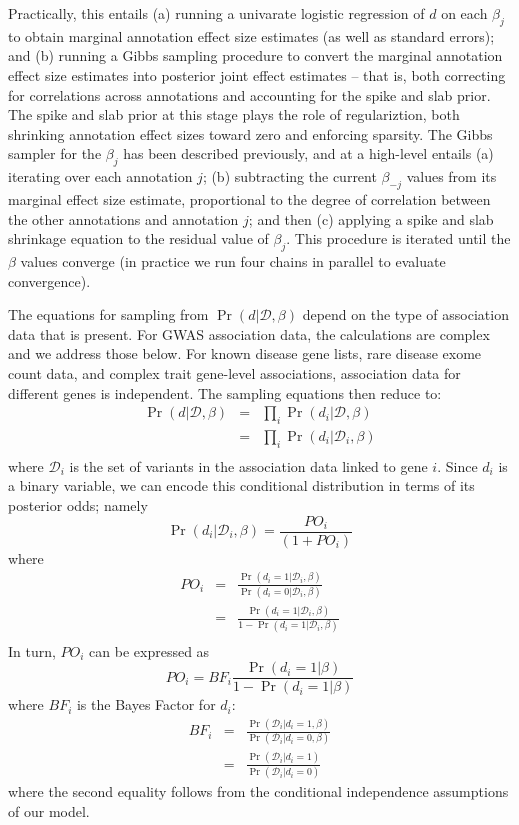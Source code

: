 Practically, this entails (a) running a univarate logistic regression of $d$ on each
    $\beta_j$ to obtain marginal annotation effect size estimates (as
    well as standard errors); and (b) running a Gibbs sampling
    procedure to convert the marginal annotation effect size estimates
    into posterior joint effect estimates -- that is, both correcting
    for correlations across annotations and accounting for the spike
    and slab prior. The spike and slab prior at this stage plays the
    role of regulariztion, both shrinking annotation effect sizes
    toward zero and enforcing sparsity. The Gibbs sampler for the
    $\beta_j$ has been described previously, and at a high-level
    entails (a) iterating over each annotation $j$; (b) subtracting the
    current $\beta_{-j}$ values from its marginal effect size
    estimate, proportional to the degree of correlation between the
    other annotations and annotation $j$; and then (c) applying a
    spike and slab shrinkage equation to the residual value of
    $\beta_j$. This procedure is iterated until the $\beta$ values
    converge (in practice we run four chains in parallel to evaluate
    convergence\cite{}).

    
The equations for sampling from
$\Pr\left(d|\mathcal{D},\beta\right)$ depend on the
type of association data that is present. For GWAS association data,
the calculations are complex and we address those below. For known disease gene
lists, rare disease exome count data, and complex trait gene-level
associations, association data for different genes is independent. The
sampling equations then reduce to:
\begin{eqnarray*}
  \Pr\left(d|\mathcal{D},\beta\right) &=&
  \prod_i\Pr\left(d_i|\mathcal{D},\beta\right) \\
  &=& \prod_i\Pr\left(d_i|\mathcal{D}_i,\beta\right) \\
\end{eqnarray*}
where $\mathcal{D}_i$ is the set of variants in the association data
linked to gene $i$.
Since $d_i$ is a binary variable, we can encode this conditional
distribution in terms of its posterior odds; namely
\[\Pr\left(d_i|\mathcal{D}_i,\beta\right) = \frac{PO_i}{\left(1 + PO_i\right)} \]
where
\begin{eqnarray*}
  PO_i & = &
\frac{\Pr\left(d_i=1|\mathcal{D}_i,\beta\right)}{\Pr\left(d_i=0|\mathcal{D}_i,\beta\right)}\\
& = & \frac{\Pr\left(d_i=1|\mathcal{D}_i,\beta\right)}{1 - \Pr\left(d_i=1|\mathcal{D}_i,\beta\right)}\\
\end{eqnarray*}
In turn, $PO_i$ can be expressed as
\[PO_i = BF_i\frac{\Pr\left(d_i=1|\beta\right)}{1-\Pr\left(d_i=1|\beta\right)}\]
where $BF_i$ is the Bayes Factor for $d_i$:
\begin{eqnarray*}
  BF_i & = &
  \frac{\Pr\left(\mathcal{D}_i|d_i=1,\beta\right)}{\Pr\left(\mathcal{D}_i|d_i=0,\beta\right)} \\
  & = & \frac{\Pr\left(\mathcal{D}_i|d_i=1\right)}{\Pr\left(\mathcal{D}_i|d_i=0\right)}
\end{eqnarray*}
where the second equality follows from the conditional independence
assumptions of our model.

